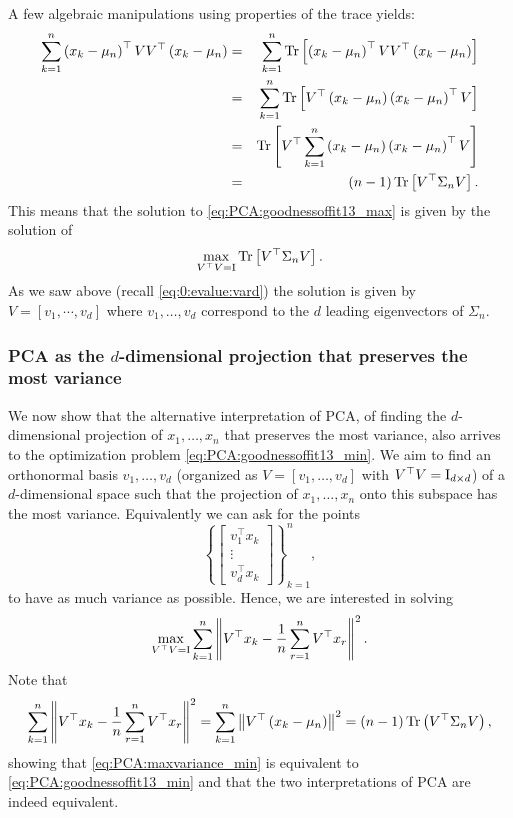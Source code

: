 A few algebraic manipulations using properties of the trace yields:
\begin{eqnarray*}
 \sum_{k=1}^n \left( x_k - \mu_n \right)^\top  VV^\top  \left(x_k - \mu_n\right) & = &\sum_{k=1}^n \operatorname{Tr}\left[  \left( x_k - \mu_n \right)^\top  VV^\top  \left(x_k - \mu_n\right)  \right] \\
 & = & \sum_{k=1}^n\operatorname{Tr}\left[  V^\top  \left(x_k - \mu_n\right)\left( x_k - \mu_n \right)^\top  V  \right] \\
 & = & \operatorname{Tr}\left[  V^\top  \sum_{k=1}^n\left(x_k - \mu_n\right)\left( x_k - \mu_n \right)^\top  V  \right] \\
 & = & (n-1)\operatorname{Tr}\left[  V^\top   \Sigma_n V  \right].
\end{eqnarray*}
This means that the solution to \eqref{eq:PCA:goodnessoffit13_max} is given by the solution of
\begin{equation}\label{eq:PCA:goodnessoffit13_min}
 \max_{V^\top  V=\operatorname{I}} \operatorname{Tr}\left[  V^\top   \Sigma_n V  \right].
\end{equation}
As we saw above (recall \eqref{eq:0:evalue:vard}) the solution is given by $V=\left[v_1,\cdots,v_d\right]$ where $v_1,\dots,v_d$ correspond to the $d$ leading eigenvectors of $\Sigma_n$.

\subsubsection{PCA as the $d$-dimensional projection that preserves the most variance}

We now show that the alternative interpretation of PCA, of finding the $d$-dimensional projection of $x_1,\dots,x_n$ that preserves the most variance, also arrives to the optimization problem \eqref{eq:PCA:goodnessoffit13_min}.
We aim to find an orthonormal basis $v_1,\dots,v_d$ (organized as $V=\left[v_1,\dots,v_d\right]$ with $V^\top  V = \operatorname{I}_{d\times d}$) of a $d$-dimensional space such that the projection of $x_1,\dots,x_n$ onto this subspace has the most variance. Equivalently we can ask for the points
\[
 \left\{   \left[\begin{array}{c} v_1^\top  x_k  \\ \vdots \\ v_d^\top  x_k\end{array}\right]   \right\}_{k=1}^n,
\]
to have as much variance as possible. Hence, we are interested in solving
\begin{equation}\label{eq:PCA:maxvariance_min}
\max_{V^\top  V=\operatorname{I}} \sum_{k=1}^n\left\|  V^\top  x_k - \frac1n \sum_{r=1}^n V^\top  x_r   \right\|^2.
\end{equation}
Note that
\[
\sum_{k=1}^n\left\|  V^\top  x_k- \frac1n \sum_{r=1}^n V^\top  x_r   \right\|^2 = \sum_{k=1}^n\left\|  V^\top  \left(x_k-\mu_n\right)   \right\|^2 = (n-1) \operatorname{Tr}\left(V^\top  \Sigma_n V\right),
\]
showing that \eqref{eq:PCA:maxvariance_min} is equivalent to \eqref{eq:PCA:goodnessoffit13_min} and that the two interpretations of PCA are indeed equivalent.

